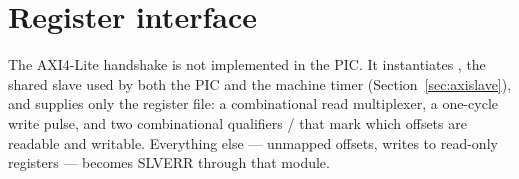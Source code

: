 \section{Register interface}

The AXI4-Lite handshake is not implemented in the PIC. It instantiates
, the shared slave used by both the PIC and the
machine timer (Section~\ref{sec:axislave}), and supplies only the register file:
a combinational read multiplexer, a one-cycle write pulse, and two
combinational qualifiers  /  that mark which offsets are
readable and writable. Everything else --- unmapped offsets, writes to read-only
registers --- becomes SLVERR through that module.

